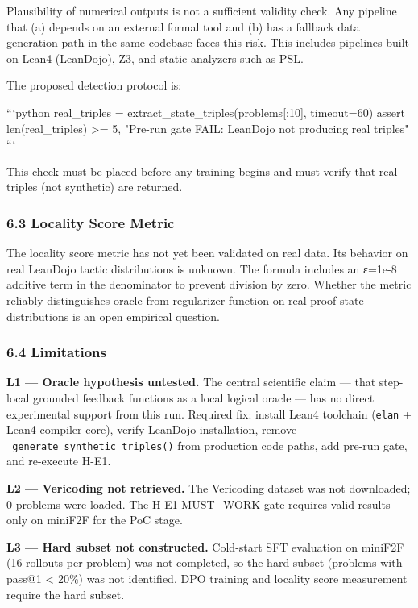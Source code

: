 Plausibility of numerical outputs is not a sufficient validity check. Any pipeline that (a) depends on an external formal tool and (b) has a fallback data generation path in the same codebase faces this risk. This includes pipelines built on Lean4 (LeanDojo), Z3, and static analyzers such as PSL.

The proposed detection protocol is:

```python
real_triples = extract_state_triples(problems[:10], timeout=60)
assert len(real_triples) >= 5, "Pre-run gate FAIL: LeanDojo not producing real triples"
```

This check must be placed before any training begins and must verify that real triples (not synthetic) are returned.

\subsubsection{6.3 Locality Score Metric}

The locality score metric has not yet been validated on real data. Its behavior on real LeanDojo tactic distributions is unknown. The formula includes an ε=1e-8 additive term in the denominator to prevent division by zero. Whether the metric reliably distinguishes oracle from regularizer function on real proof state distributions is an open empirical question.

\subsubsection{6.4 Limitations}

\textbf{L1 — Oracle hypothesis untested.} The central scientific claim — that step-local grounded feedback functions as a local logical oracle — has no direct experimental support from this run. Required fix: install Lean4 toolchain (\texttt{elan} + Lean4 compiler core), verify LeanDojo installation, remove \texttt{_generate_synthetic_triples()} from production code paths, add pre-run gate, and re-execute H-E1.

\textbf{L2 — Vericoding not retrieved.} The Vericoding dataset was not downloaded; 0 problems were loaded. The H-E1 MUST_WORK gate requires valid results only on miniF2F for the PoC stage.

\textbf{L3 — Hard subset not constructed.} Cold-start SFT evaluation on miniF2F (16 rollouts per problem) was not completed, so the hard subset (problems with pass@1 < 20\%) was not identified. DPO training and locality score measurement require the hard subset.


